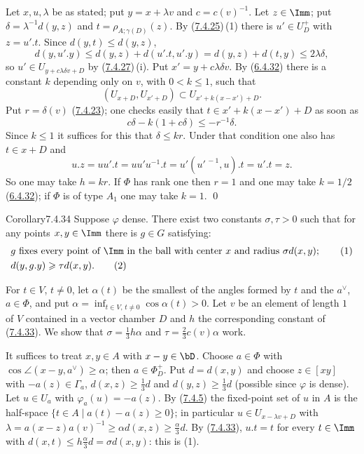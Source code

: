 \documentclass[12pt,a4paper,oneside,english]{smfart}
\makeatletter
\newcommand{\btanchor}[1]{\leavevmode\Hy@raisedlink{\hypertarget{bt:#1}{}}}
\newcommand{\btref}[1]{\hyperlink{bt:#1}{#1}}
\theoremstyle{definition}
\theoremstyle{bt}
\makeatother
\begin{document}
\pf Let $x,u,\lambda$ be as stated; put $y=x+\lambda v$ and $c=c(v)^{-1}$. Let
$z\in\Imm$; put $\delta=\lambda^{-1}d(y,z)$ and $t=\rho_{A;\gamma(D)}(z)$. By
(\btref{7.4.25})\,(1) there is $u'\in U_D^{+}$ with $z=u'.t$. Since $d(y,t)\leqslant d(y,z)$,
\[
  d(y,u'.y)\leqslant d(y,z)+d(u'.t,u'.y)=d(y,z)+d(t,y)\leqslant2\lambda\delta,
\]
so $u'\in U_{y+c\lambda\delta v+D}$ by (\btref{7.4.27})\,(i). Put $x'=y+c\lambda\delta v$. By
(\btref{6.4.32}) there is a constant $k$ depending only on $v$, with $0<k\leqslant1$, such
that
\[
  (U_{x+D},U_{x'+D})\subset U_{x'+k(x-x')+D}.
\]
Put $r=\delta(v)$ (\btref{7.4.23}); one checks easily that $t\in x'+k(x-x')+D$ as soon as
\[
  c\delta-k(1+c\delta)\leqslant-r^{-1}\delta .
\]
Since $k\leqslant1$ it suffices for this that $\delta\leqslant kr$. Under that
condition one also has $t\in x+D$ and
\[
  u.z=uu'.t=uu'u^{-1}.t=u'(u'^{\,-1},u).t=u'.t=z .
\]
So one may take $h=kr$. If $\Phi$ has rank one then $r=1$ and one may take $k=1/2$
(\btref{6.4.32}); if $\Phi$ is of type $A_1$ one may take $k=1$. \qed

\begin{stmt}{Corollary}{7.4.34}\btanchor{7.4.34}
Suppose $\varphi$ dense. There exist two constants $\sigma,\tau>0$ such that for any
points $x,y\in\Imm$ there is $g\in G$ satisfying:
\begin{align}
  &g\text{ fixes every point of }\Imm\text{ in the ball with center }x
   \text{ and radius }\sigma d(x,y); \tag{1}\\
  &d(y,g.y)\geqslant\tau d(x,y). \tag{2}
\end{align}
\end{stmt}

\pf For $t\in V$, $t\neq0$, let $\alpha(t)$ be the smallest of the angles formed by
$t$ and the $a^{\vee}$, $a\in\Phi$, and put
$\alpha=\inf_{t\in V,\,t\neq0}\cos\alpha(t)>0$. Let $v$ be an element of length $1$
of $V$ contained in a vector chamber $D$ and $h$ the corresponding constant of
(\btref{7.4.33}). We show that $\sigma=\tfrac13h\alpha$ and $\tau=\tfrac23c(v)\alpha$ work.

It suffices to treat $x,y\in A$ with $x-y\in\bD$. Choose $a\in\Phi$ with
$\cos\angle(x-y,a^{\vee})\geqslant\alpha$; then $a\in\Phi_D^{+}$. Put $d=d(x,y)$ and
choose $z\in[xy]$ with $-a(z)\in\Gamma_a$, $d(x,z)\geqslant\tfrac13d$ and
$d(y,z)\geqslant\tfrac13d$ (possible since $\varphi$ is dense). Let $u\in U_a$ with
$\varphi_a(u)=-a(z)$. By (\btref{7.4.5}) the fixed-point set of $u$ in $A$ is the half-space
$\{t\in A\mid a(t)-a(z)\geqslant0\}$; in particular $u\in U_{x-\lambda v+D}$ with
$\lambda=a(x-z)a(v)^{-1}\geqslant\alpha d(x,z)\geqslant\tfrac{\alpha}{3}d$. By
(\btref{7.4.33}), $u.t=t$ for every $t\in\Imm$ with
$d(x,t)\leqslant h\tfrac{\alpha}{3}d=\sigma d(x,y)$: this is (1).
\end{document}
